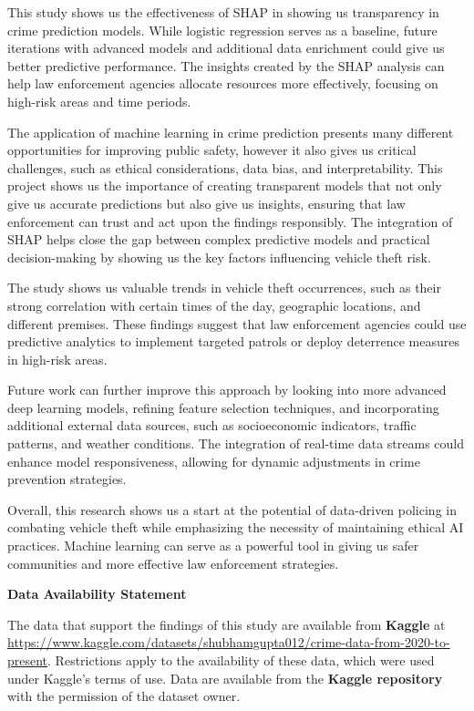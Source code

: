 \documentclass[
]{article}
\begin{document}
This study shows us the effectiveness of SHAP in showing us transparency
in crime prediction models. While logistic regression serves as a
baseline, future iterations with advanced models and additional data
enrichment could give us better predictive performance. The insights
created by the SHAP analysis can help law enforcement agencies allocate
resources more effectively, focusing on high-risk areas and time
periods.

The application of machine learning in crime prediction presents many
different opportunities for improving public safety, however it also
gives us critical challenges, such as ethical considerations, data bias,
and interpretability. This project shows us the importance of creating
transparent models that not only give us accurate predictions but also
give us insights, ensuring that law enforcement can trust and act upon
the findings responsibly. The integration of SHAP helps close the gap
between complex predictive models and practical decision-making by
showing us the key factors influencing vehicle theft risk.

The study shows us valuable trends in vehicle theft occurrences, such as
their strong correlation with certain times of the day, geographic
locations, and different premises. These findings suggest that law
enforcement agencies could use predictive analytics to implement
targeted patrols or deploy deterrence measures in high-risk areas.

Future work can further improve this approach by looking into more
advanced deep learning models, refining feature selection techniques,
and incorporating additional external data sources, such as
socioeconomic indicators, traffic patterns, and weather conditions. The
integration of real-time data streams could enhance model
responsiveness, allowing for dynamic adjustments in crime prevention
strategies.

Overall, this research shows us a start at the potential of data-driven
policing in combating vehicle theft while emphasizing the necessity of
maintaining ethical AI practices. Machine learning can serve as a
powerful tool in giving us safer communities and more effective law
enforcement strategies.

\textbf{Data Availability Statement}

The data that support the findings of this study are available from
\textbf{Kaggle} at
\url{https://www.kaggle.com/datasets/shubhamgupta012/crime-data-from-2020-to-present}.
Restrictions apply to the availability of these data, which were used
under Kaggle's terms of use. Data are available from the \textbf{Kaggle
repository} with the permission of the dataset owner.
\end{document}
